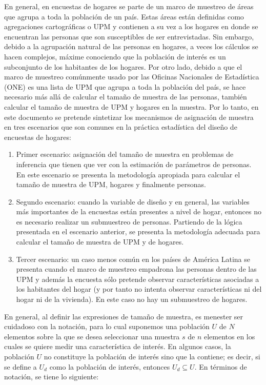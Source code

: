 \documentclass[12pt,spanish,]{book}
\begin{document}
En general, en encuestas de hogares se parte de un marco de muestreo de áreas que agrupa a toda la población de un país. Estas áreas están definidas como agregaciones cartográficas o UPM y contienen a su vez a los hogares en donde se encuentran las personas que son susceptibles de ser entrevistadas. Sin embargo, debido a la agrupación natural de las personas en hogares, a veces los cálculos se hacen complejos, máxime conociendo que la población de interés es un subconjunto de los habitantes de los hogares. Por otro lado, debido a que el marco de muestreo comúnmente usado por las Oficinas Nacionales de Estadística (ONE) es una lista de UPM que agrupa a toda la población del país, se hace necesario más allá de calcular el tamaño de muestra de las personas, también calcular el tamaño de muestra de UPM y hogares en la muestra. Por lo tanto, en este documento se pretende sintetizar los mecanismos de asignación de muestra en tres escenarios que son comunes en la práctica estadística del diseño de encuestas de hogares:

\begin{enumerate}
\def\labelenumi{\arabic{enumi}.}
\item
  Primer escenario: asignación del tamaño de muestra en problemas de inferencia que tienen que ver con la estimación de parámetros de personas. En este escenario se presenta la metodología apropiada para calcular el tamaño de muestra de UPM, hogares y finalmente personas.
\item
  Segundo escenario: cuando la variable de diseño y en general, las variables más importantes de la encuestas están presentes a nivel de hogar, entonces no es necesario realizar un submuestreo de personas. Partiendo de la lógica presentada en el escenario anterior, se presenta la metodología adecuada para calcular el tamaño de muestra de UPM y de hogares.
\item
  Tercer escenario: un caso menos común en los países de América Latina se presenta cuando el marco de muestreo empadrona las personas dentro de las UPM y además la encuesta sólo pretende observar características asociadas a los habitantes del hogar (y por tanto no intenta observar características ni del hogar ni de la vivienda). En este caso no hay un submuestreo de hogares.
\end{enumerate}

En general, al definir las expresiones de tamaño de muestra, es menester ser cuidadoso con la notación, para lo cual suponemos una población \(U\) de \(N\) elementos sobre la que se desea seleccionar una muestra \(s\) de \(n\) elementos en los cuales se quiere medir una característica de interés. En algunos casos, la población \(U\) no constituye la población de interés sino que la contiene; es decir, si se define a \(U_d\) como la población de interés, entonces \(U_d \subseteq U\). En términos de notación, se tiene lo siguiente:
\end{document}
